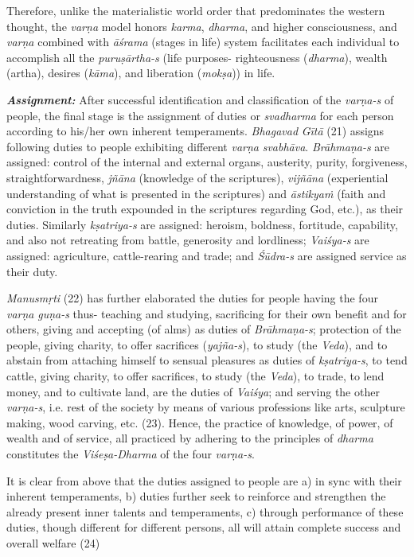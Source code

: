 Therefore, unlike the materialistic world order that predominates the western thought, the \emph{varṇa} model honors \emph{karma}, \emph{dharma}, and higher consciousness, and \emph{varṇa} combined with \emph{āśrama} (stages in life) system facilitates each individual to accomplish all the \emph{puruṣārtha-s} (life purposes- righteousness (\emph{dharma}), wealth (artha), desires (\emph{kāma}), and liberation (\emph{mokṣa})) in life.

\emph{\textbf{Assignment:}} After successful identification and classification of the \emph{varṇa-s} of people, the final stage is the assignment of duties or \emph{svadharma} for each person according to his/her own inherent temperaments. \emph{Bhagavad} \emph{Gītā} (21) assigns following duties to people exhibiting different \emph{varṇa} \emph{svabhāva}. \emph{Brāhmaṇa-s} are assigned: control of the internal and external organs, austerity, purity, forgiveness, straightforwardness, \emph{jñāna} (knowledge of the scriptures), \emph{vijñāna} (experiential understanding of what is presented in the scriptures) and \emph{āstikyaṁ} (faith and conviction in the truth expounded in the scriptures regarding God, etc.), as their duties. Similarly \emph{kṣatriya-s} are assigned: heroism, boldness, fortitude, capability, and also not retreating from battle, generosity and lordliness; \emph{Vaiśya-s} are assigned: agriculture, cattle-rearing and trade; and \emph{Śūdra-s} are assigned service as their duty.

\emph{Manusmṛti} (22) has further elaborated the duties for people having the four \emph{varṇa} \emph{guṇa-s} thus- teaching and studying, sacrificing for their own benefit and for others, giving and accepting (of alms) as duties of \emph{Brāhmaṇa-s}; protection of the people, giving charity, to offer sacrifices (\emph{yajña-s}), to study (the \emph{Veda}), and to abstain from attaching himself to sensual pleasures as duties of \emph{kṣatriya-s}, to tend cattle, giving charity, to offer sacrifices, to study (the \emph{Veda}), to trade, to lend money, and to cultivate land, are the duties of \emph{Vaiśya}; and serving the other \emph{varṇa-s}, i.e. rest of the society by means of various professions like arts, sculpture making, wood carving, etc. (23). Hence, the practice of knowledge, of power, of wealth and of service, all practiced by adhering to the principles of \emph{dharma} constitutes the \emph{Viśeṣa-Dharma} of the four \emph{varṇa-s}.
\vskip 2pt

It is clear from above that the duties assigned to people are a) in sync with their inherent temperaments, b) duties further seek to reinforce and strengthen the already present inner talents and temperaments, c) through performance of these duties, though different for different persons, all will attain complete success and overall welfare (24)
\vskip 2pt

